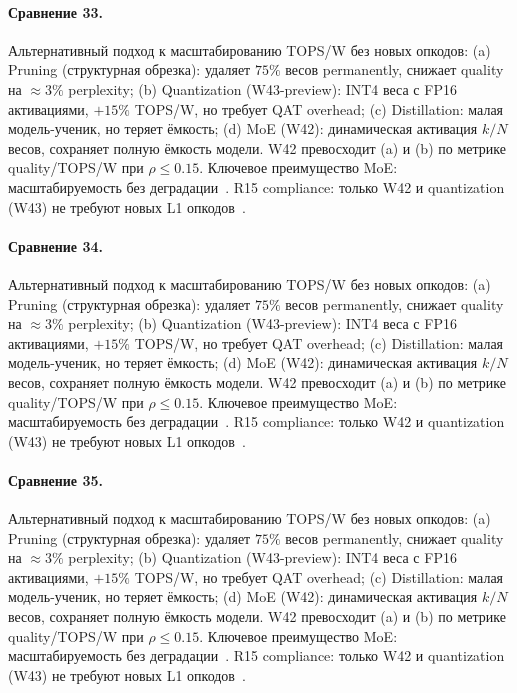 \paragraph{Сравнение 33.} Альтернативный подход к масштабированию TOPS/W без новых опкодов: (a) Pruning (структурная обрезка): удаляет $75\%$ весов permanently, снижает quality на $\approx 3\%$ perplexity; (b) Quantization (W43-preview): INT4 веса с FP16 активациями, $+15\%$ TOPS/W, но требует QAT overhead; (c) Distillation: малая модель-ученик, но теряет ёмкость; (d) MoE (W42): динамическая активация $k/N$ весов, сохраняет полную ёмкость модели. W42 превосходит (a) и (b) по метрике quality/TOPS/W при $\rho \leq 0{.}15$. Ключевое преимущество MoE: масштабируемость без деградации~\cite{switch_transformer2021,mixtral2024}. R15 compliance: только W42 и quantization (W43) не требуют новых L1 опкодов~\cite{lee_gvsu_proof2021}.

\paragraph{Сравнение 34.} Альтернативный подход к масштабированию TOPS/W без новых опкодов: (a) Pruning (структурная обрезка): удаляет $75\%$ весов permanently, снижает quality на $\approx 3\%$ perplexity; (b) Quantization (W43-preview): INT4 веса с FP16 активациями, $+15\%$ TOPS/W, но требует QAT overhead; (c) Distillation: малая модель-ученик, но теряет ёмкость; (d) MoE (W42): динамическая активация $k/N$ весов, сохраняет полную ёмкость модели. W42 превосходит (a) и (b) по метрике quality/TOPS/W при $\rho \leq 0{.}15$. Ключевое преимущество MoE: масштабируемость без деградации~\cite{switch_transformer2021,mixtral2024}. R15 compliance: только W42 и quantization (W43) не требуют новых L1 опкодов~\cite{lee_gvsu_proof2021}.

\paragraph{Сравнение 35.} Альтернативный подход к масштабированию TOPS/W без новых опкодов: (a) Pruning (структурная обрезка): удаляет $75\%$ весов permanently, снижает quality на $\approx 3\%$ perplexity; (b) Quantization (W43-preview): INT4 веса с FP16 активациями, $+15\%$ TOPS/W, но требует QAT overhead; (c) Distillation: малая модель-ученик, но теряет ёмкость; (d) MoE (W42): динамическая активация $k/N$ весов, сохраняет полную ёмкость модели. W42 превосходит (a) и (b) по метрике quality/TOPS/W при $\rho \leq 0{.}15$. Ключевое преимущество MoE: масштабируемость без деградации~\cite{switch_transformer2021,mixtral2024}. R15 compliance: только W42 и quantization (W43) не требуют новых L1 опкодов~\cite{lee_gvsu_proof2021}.

